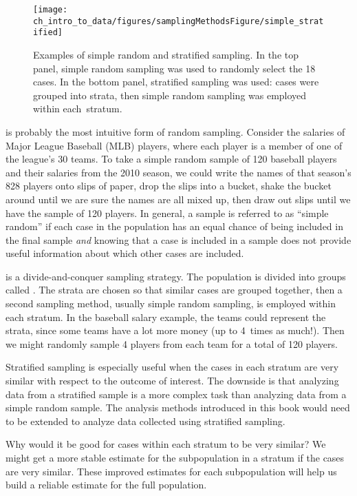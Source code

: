 \begin{figure}
\centering
\texttt{[image: ch\_intro\_to\_data/figures/samplingMethodsFigure/simple\_stratified]}
\caption{Examples of simple random and stratified sampling. In the top panel, simple random sampling was used to randomly select the 18 cases. In the bottom panel, stratified sampling was used: cases were grouped into strata, then simple random sampling was employed within \mbox{each stratum}.}
\label{simple_stratified}
\end{figure}

 is probably the most intuitive form of random sampling. Consider the salaries of Major League Baseball (MLB) players, where each player is a member of one of the league's 30 teams. To take a simple random sample of 120 baseball players and their salaries from the 2010 season, we could write the names of that season's 828 players onto slips of paper, drop the slips into a bucket, shake the bucket around until we are sure the names are all mixed up, then draw out slips until we have the sample of 120 players. In general, a sample is referred to as ``simple random'' if each case in the population has an equal chance of being included in the final sample \emph{and} knowing that a case is included in a sample does not provide useful information about which other cases are included.

 is a divide-and-conquer sampling strategy. The population is divided into groups called . The strata are chosen so that similar cases are grouped together, then a second sampling method, usually simple random sampling, is employed within each stratum. In the baseball salary example, the teams could represent the strata, since some teams have a lot more money (up to 4~times as much!). Then we might randomly sample 4 players from each team for a total of 120 players.

Stratified sampling is especially useful when the cases in each stratum are very similar with respect to the outcome of interest. The downside is that analyzing data from a stratified sample is a more complex task than analyzing data from a simple random sample. The analysis methods introduced in this book would need to be extended to analyze data collected using stratified sampling.

\begin{example}{Why would it be good for cases within each stratum to be very similar?}
We might get a more stable estimate for the subpopulation in a stratum if the cases are very similar. These improved estimates for each subpopulation will help us build a reliable estimate for the full population.
\end{example}

